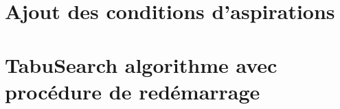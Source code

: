 \documentclass[a4paper,10pt]{article}
\begin{document}
\section{Ajout des conditions d'aspirations}

\section{TabuSearch algorithme avec procédure de redémarrage}
\end{document}
